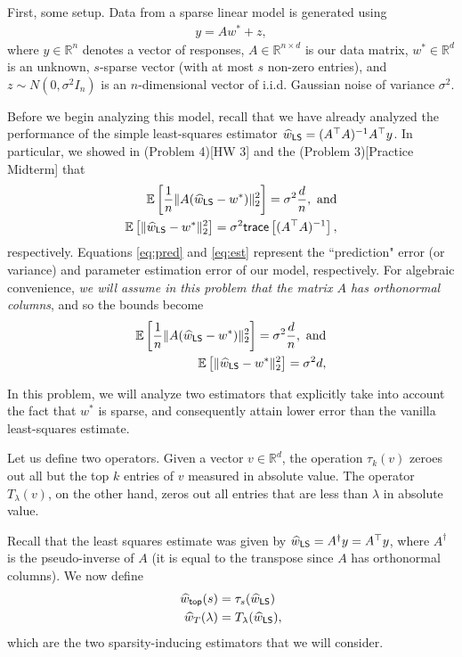 First, some setup. Data from a sparse linear model is generated using
\begin{align*}
y = A w^* + z,
\end{align*}
where $y \in \mathbb{R}^n$ denotes a vector of responses, $A \in \mathbb{R}^{n \times d}$ is our data matrix, $w^* \in \mathbb{R}^d$ is an unknown, $s$-sparse vector (with at most $s$ non-zero entries), and $z \sim N(0, \sigma^2 I_n)$ is an $n$-dimensional vector of i.i.d. Gaussian noise of variance $\sigma^2$.

Before we begin analyzing this model, recall that we have already analyzed the performance of the simple least-squares estimator $\widehat{w}_{{\sf LS}} = (A^\top A)^{-1} A^\top y$. In particular, we showed in (Problem 4)[HW 3] and the (Problem 3)[Practice Midterm] that
\begin{align}
\mathbb{E} \left[ \frac{1}{n} \| A(\widehat{w}_{{\sf LS}} - w^*) \|_2^2 \right] = \sigma^2 \frac{d}{n}, \text{ and} \label{eq:pred} \\
\mathbb{E} \left[ \| \widehat{w}_{{\sf LS}} - w^* \|_2^2 \right] = \sigma^2 \mathsf{trace} \left[(A^\top A)^{-1} \right], \label{eq:est}
\end{align}
respectively. Equations \eqref{eq:pred} and \eqref{eq:est} represent the ``prediction" error (or variance) and parameter estimation error of our model, respectively. For algebraic convenience, \emph{we will assume in this problem that the matrix $A$ has orthonormal columns}, and so the bounds become
\begin{align}
\mathbb{E} \left[ \frac{1}{n} \| A(\widehat{w}_{{\sf LS}} - w^*) \|_2^2 \right] = \sigma^2 \frac{d}{n}, \text{ and} \label{eq:pred1} \\
\mathbb{E} \left[ \| \widehat{w}_{{\sf LS}} - w^* \|_2^2 \right] = \sigma^2 d, \label{eq:est1}
\end{align}

In this problem, we will analyze two estimators that explicitly take into account the fact that $w^*$ is sparse, and consequently attain lower error than the vanilla least-squares estimate.

Let us define two operators. Given a vector $v \in \mathbb{R}^d$, the operation $\tau_k (v)$ zeroes out all but the top $k$ entries of $v$ measured in absolute value. The operator $T_{\lambda}(v)$, on the other hand, zeros out all entries that are less than $\lambda$ in absolute value.

Recall that the least squares estimate was given by $\widehat{w}_{{\sf LS}} = A^{\dagger} y = A^\top y$, where $A^\dagger$ is the pseudo-inverse of $A$ (it is equal to the transpose since $A$ has orthonormal columns). We now define
\begin{align*}
\widehat{w}_{{\sf top}}(s) &= \tau_s(\widehat{w}_{{\sf LS}}) \\
\widehat{w}_T(\lambda) &= T_\lambda (\widehat{w}_{{\sf LS}}),
\end{align*}
which are the two sparsity-inducing estimators that we will consider.

